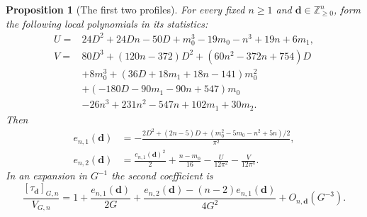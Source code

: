 \documentclass[a4paper,10pt]{article}
\numberwithin{equation}{section}
\theoremstyle{paperplain}
\newtheorem{prp}[thm]{Proposition}
\theoremstyle{paperremark}
\theoremstyle{paperplain}
\begin{document}
\begin{prp}[The first two profiles]\label{prp:a:profiles}
For every fixed $n\geq1$ and $\mathbf d\in\mathbb Z_{\geq0}^n$,
form the following local polynomials in its statistics:
\begin{align*}
 U={}&24D^2+24Dn-50D+m_0^3-19m_0-n^3+19n+6m_1,\\
 V={}&80D^3+(120n-372)D^2+(60n^2-372n+754)D\\
 &+8m_0^3+(36D+18m_1+18n-141)m_0^2\\
 &+(-180D-90m_1-90n+547)m_0\\
 &-26n^3+231n^2-547n+102m_1+30m_2.
\end{align*}
Then
\begin{align}
 e_{n,1}(\mathbf d)
 &=-\frac{2D^2+(2n-5)D+(m_0^2-5m_0-n^2+5n)/2}{\pi^2},
 \label{eq:a:first-profile}\\
 e_{n,2}(\mathbf d)
 &=\frac{e_{n,1}(\mathbf d)^2}{2}+\frac{n-m_0}{16}
                  -\frac{U}{12\pi^2}-\frac{V}{12\pi^4}.
 \label{eq:a:second-profile}
\end{align}
In an expansion in $G^{-1}$ the second coefficient is
\begin{equation}\label{eq:a:profile-genus-conversion}
 \frac{[\tau_{\mathbf d}]_{G,n}}{V_{G,n}}
 =1+\frac{e_{n,1}(\mathbf d)}{2G}
 +\frac{e_{n,2}(\mathbf d)-(n-2)e_{n,1}(\mathbf d)}{4G^2}
 +O_{n,\mathbf d}(G^{-3}).
\end{equation}
\end{prp}
\end{document}
